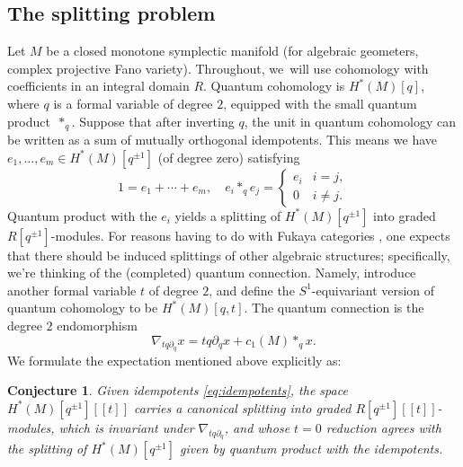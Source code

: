 \documentclass[JEP,XML,SOM,Unicode,NoFloatCountersInSection,published]{cedram}
\newcommand{\llbracket}{[\![}
\newcommand{\rrbracket}{]\!]}
\theoremstyle{plain}
\newtheorem{conjecture}[theorem]{Conjecture}
\theoremstyle{definition}
\begin{document}
\subsection{The splitting problem}
Let $M$ be a closed monotone symplectic manifold (for algebraic geometers, complex projective Fano variety). Throughout, we~will use cohomology with coefficients in an integral domain $R$. Quantum cohomology is $H^*(M)[q]$, where $q$ is a formal variable of degree $2$, equipped with the small quantum product~$\ast_q$. Suppose that after inverting $q$, the unit in quantum cohomology can be written as a sum of mutually orthogonal idempotents. This means we have $e_1,\dots,e_m \in H^*(M)[q^{\pm 1}]$ (of degree zero) satisfying
\begin{equation} \label{eq:idempotents}
1 = e_1 + \cdots + e_m, \quad e_i \ast_q e_j = \begin{cases} e_i & i = j, \\ 0 & i \neq j.
\end{cases}
\end{equation}
Quantum product with the $e_i$ yields a splitting of $H^*(M)[q^{\pm 1}]$ into graded $R[q^{\pm 1}]$-modules. For reasons having to do with Fukaya categories \cite{hugtenburg24, chen24}, one expects that there should be induced splittings of other algebraic structures; specifically, we're thinking of the (completed) quantum connection. Namely, introduce another formal variable $t$ of degree $2$, and define the $S^1$-equivariant version of quantum cohomology to be $H^*(M)[q,t]$. The quantum connection is the degree $2$ endomorphism
\begin{equation*}
\nabla_{tq\partial_q} x = tq\partial_q x + c_1(M) \ast_q x.
\end{equation*}
We formulate the expectation mentioned above explicitly as:

\begin{conjecture} \label{th:splitting-conjecture}
Given idempotents \eqref{eq:idempotents}, the space $H^*(M)[q^{\pm 1}]\llbracket t\rrbracket$ carries a canonical splitting into graded $R[q^{\pm 1}]\llbracket t\rrbracket$-modules, which is invariant under $\nabla_{tq\partial_q}$, and whose $t = 0$ reduction agrees with the splitting of $H^*(M)[q^{\pm 1}]$ given by quantum product with the idempotents.
\end{conjecture}
\end{document}
